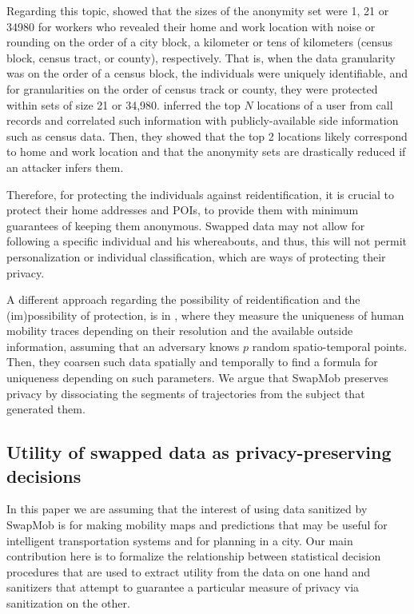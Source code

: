 Regarding this topic, \cite{Golle:2009} showed that the sizes of the anonymity set were 1, 21 or 34980 for workers who revealed their home and work location with noise or rounding on the order of a city block, a kilometer or tens of kilometers (census block, census tract, or county), respectively. 
That is, when the data granularity was on the order of a census block, the individuals were uniquely identifiable, and for granularities on the order of census track or county, they were protected within sets of size 21 or 34,980.
\cite{Zang:2011} inferred the top $N$ locations of a user from call records and correlated such information with publicly-available side  information such as census data.  Then, they showed that the top 2 locations likely correspond to home and work location and that the anonymity sets are drastically reduced if an attacker infers them.

Therefore, for protecting the individuals against reidentification, it is crucial to protect their home addresses and POIs, to provide them with minimum guarantees of keeping them anonymous.
Swapped data may not allow for following a specific individual and his whereabouts, and thus, this will not permit personalization or individual classification, which are ways of protecting their privacy.

A different approach regarding the possibility of reidentification and the (im)possibility of protection, is in \cite{demontjoye2013}, where they measure the uniqueness of human mobility traces depending on their resolution and the available outside information, assuming that an adversary knows $p$ random spatio-temporal points. Then, they coarsen such data spatially and temporally to find a formula for uniqueness depending on such parameters.  
We argue that SwapMob preserves privacy by dissociating the segments of trajectories from the subject that generated them.


\subsection{Utility of swapped data as privacy-preserving decisions}\label{sect:util}

In this paper we are assuming that the interest of using data sanitized by SwapMob is for making mobility maps and predictions that may be useful for intelligent transportation systems and for planning in a city.
Our main contribution here is to formalize the relationship between statistical decision procedures that are used to extract utility from the data on one hand and sanitizers that attempt to guarantee a particular measure of privacy via sanitization on the other.  

